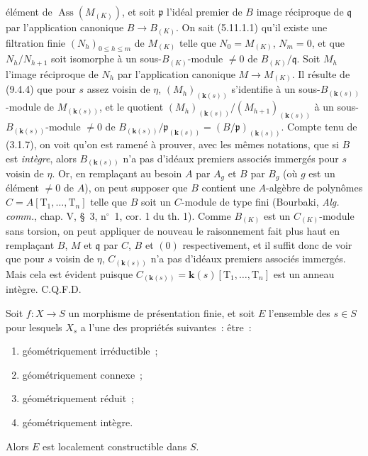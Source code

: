 
élément de $\operatorname{Ass}(M_{(K)})$, et soit $\mathfrak p$ l'idéal premier
de $B$ image réciproque de $\mathfrak q$ par l'application canonique
$B\to B_{(K)}$. On sait (5.11.1.1) qu'il existe une filtration finie
$(N_h)_{0\leqslant h\leqslant m}$ de $M_{(K)}$ telle que $N_0=M_{(K)}$,
$N_m=0$, et que $N_h/N_{h+1}$ soit isomorphe à un sous-$B_{(K)}$-module
$\neq0$ de $B_{(K)}/\mathfrak q$. Soit $M_h$ l'image réciproque de $N_h$ par
l'application canonique $M\to M_{(K)}$. Il résulte de (9.4.4) que pour $s$
assez voisin de $\eta$, $(M_h)_{(\boldsymbol{k}(s))}$ s'identifie à un
sous-$B_{(\boldsymbol{k}(s))}$-module de $M_{(\boldsymbol{k}(s))}$, et le
quotient
$(M_h)_{(\boldsymbol{k}(s))}/(M_{h+1})_{(\boldsymbol{k}(s))}$ à un
sous-$B_{(\boldsymbol{k}(s))}$-module $\neq0$ de
$B_{(\boldsymbol{k}(s))}/\mathfrak p_{(\boldsymbol{k}(s))}
=(B/\mathfrak p)_{(\boldsymbol{k}(s))}$. Compte tenu de (3.1.7), on voit qu'on
est ramené à prouver, avec les mêmes notations, que si $B$ est \emph{intègre},
alors $B_{(\boldsymbol{k}(s))}$ n'a pas d'idéaux premiers associés immergés
pour $s$ voisin de $\eta$. Or, en remplaçant au besoin $A$ par $A_g$ et $B$ par
$B_g$ (où $g$ est un élément $\neq0$ de $A$), on peut supposer que $B$ contient
une $A$-algèbre de polynômes $C=A[\mathrm T_1,\ldots,\mathrm T_n]$ telle que
$B$ soit un $C$-module de type fini (Bourbaki, \emph{Alg. comm.}, chap. V,
\S~3, n$^\circ$~1, cor. 1 du th. 1). Comme $B_{(K)}$ est un $C_{(K)}$-module
sans torsion, on peut appliquer de nouveau le raisonnement fait plus haut en
remplaçant $B$, $M$ et $\mathfrak q$ par $C$, $B$ et $(0)$ respectivement, et
il suffit donc de voir que pour $s$ voisin de $\eta$, $C_{(\boldsymbol{k}(s))}$
n'a pas d'idéaux premiers associés immergés. Mais cela est évident puisque
$C_{(\boldsymbol{k}(s))}=\boldsymbol{k}(s)[\mathrm T_1,\ldots,\mathrm T_n]$
est un anneau intègre. C.Q.F.D.

\begin{theorem}[9.7.7]
\label{IV.9.7.7-fr}
Soit $f:X\to S$ un morphisme de présentation finie, et soit $E$ l'ensemble des
$s\in S$ pour lesquels $X_s$ a l'une des propriétés suivantes~: être~:
\begin{enumerate}[label=(\roman*)]
  \item géométriquement irréductible~;
  \item géométriquement connexe~;
  \item géométriquement réduit~;
  \item géométriquement intègre.
\end{enumerate}
Alors $E$ est localement constructible dans $S$.
\end{theorem}

